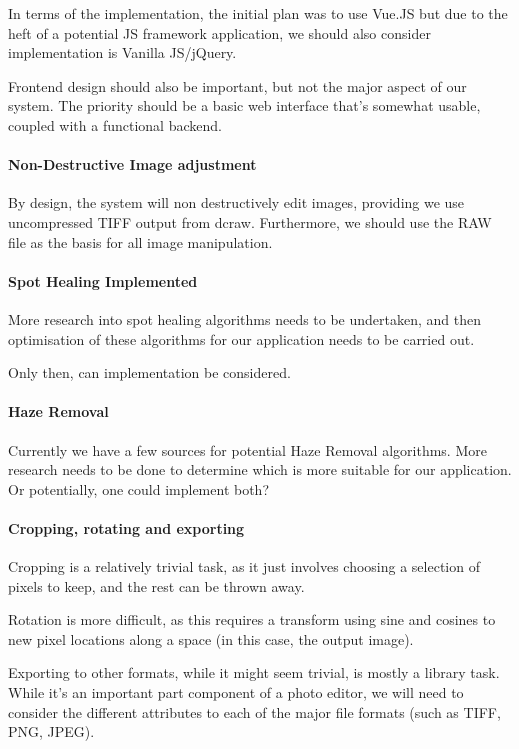 \documentclass[14pt]{article}
\begin{document}
In terms of the implementation, the initial plan was to use Vue.JS but due to the
heft of a potential JS framework application, we should also consider
implementation is Vanilla JS/jQuery.

Frontend design should also be important, but not the major aspect of our system. The priority
should be a basic web interface that's somewhat usable, coupled with a functional backend.

\paragraph{Non-Destructive Image adjustment}
By design, the system will non destructively edit images, providing we use uncompressed TIFF output from
dcraw. Furthermore, we should use the RAW file as the basis for all image manipulation.

\paragraph{Spot Healing Implemented}
More research into spot healing algorithms needs to be undertaken, and then optimisation of these algorithms for our
application needs to be carried out.

Only then, can implementation be considered.

\paragraph{Haze Removal}
Currently we have a few sources for potential Haze Removal algorithms. More research needs to be done
to determine which is more suitable for our application. Or potentially, one could implement both?

\paragraph{Cropping, rotating and exporting}
Cropping is a relatively trivial task, as it just involves choosing a selection of pixels to keep,
and the rest can be thrown away.

Rotation is more difficult, as this requires a transform using sine and cosines to new pixel locations
along a space (in this case, the output image).

Exporting to other formats, while it might seem trivial, is mostly a library task. While it's an important part component
of a photo editor, we will need to consider the different attributes to each of the major file formats (such as TIFF, PNG, JPEG).
\end{document}
